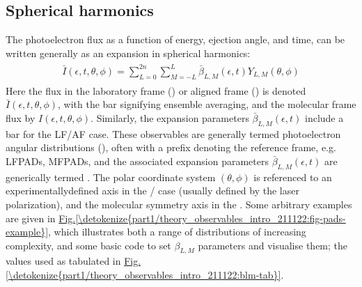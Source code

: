 \documentclass[letterpaper,table,10pt,english]{jupyterBook}
\begin{document}
\subsection{Spherical harmonics}
\label{\detokenize{part1/theory_observables_intro_211122:spherical-harmonics}}
\sphinxAtStartPar
The photoelectron flux as a function of energy, ejection angle, and time, can be written generally as an expansion in spherical harmonics:
\begin{equation}\label{equation:part1/theory_observables_intro_211122:eq:AF-PAD-general}
\begin{split}
\begin{align}
\bar{I}(\epsilon,t,\theta,\phi)=\sum_{L=0}^{2n}\sum_{M=-L}^{L}\bar{\beta}_{L,M}(\epsilon,t)Y_{L,M}(\theta,\phi)
\end{align}
\end{split}
\end{equation}
\sphinxAtStartPar
Here the flux in the laboratory frame ({\hyperref[\detokenize{backmatter/glossary:term-LF}]{}}) or aligned frame ({\hyperref[\detokenize{backmatter/glossary:term-AF}]{}}) is denoted \(\bar{I}(\epsilon,t,\theta,\phi)\), with the bar signifying ensemble averaging, and the molecular frame flux by \(I(\epsilon,t,\theta,\phi)\). Similarly, the expansion parameters \(\bar{\beta}_{L,M}(\epsilon,t)\) include a bar for the LF/AF case. These observables are generally termed photoelectron angular distributions ({\hyperref[\detokenize{backmatter/glossary:term-PADs}]{}}), often with a prefix denoting the reference frame, e.g. LFPADs, MFPADs, and the associated expansion parameters \(\bar{\beta}_{L,M}(\epsilon,t)\) are generically termed {\hyperref[\detokenize{backmatter/glossary:term-anisotropy-paramters}]{}}. The polar coordinate system \((\theta,\phi)\) is referenced to
an experimentally\sphinxhyphen{}defined axis in the {\hyperref[\detokenize{backmatter/glossary:term-LF}]{}}/{\hyperref[\detokenize{backmatter/glossary:term-AF}]{}} case (usually defined by the laser polarization), and the molecular symmetry axis in the {\hyperref[\detokenize{backmatter/glossary:term-MF}]{}}. Some arbitrary examples are given in \hyperref[\detokenize{part1/theory_observables_intro_211122:fig-pads-example}]{Fig.\@ \ref{\detokenize{part1/theory_observables_intro_211122:fig-pads-example}}}, which illustrates both a range of distributions of increasing complexity, and some basic code to set \(\beta_{L,M}\) parameters and visualise them; the values used as tabulated in  \hyperref[\detokenize{part1/theory_observables_intro_211122:blm-tab}]{Fig.\@ \ref{\detokenize{part1/theory_observables_intro_211122:blm-tab}}}.
\end{document}
